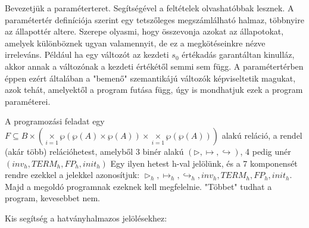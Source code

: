 \documentclass{article}
\begin{document}
Bevezetjük a paraméterteret. Segítségével a feltételek olvashatóbbak lesznek. A paramétertér definíciója szerint egy tetszőleges megszámlálható halmaz, többnyire az állapottér altere. Szerepe olyasmi, hogy összevonja azokat az állapotokat, amelyek különböznek ugyan valamennyit, de ez a megkötéseinkre nézve irreleváns. Például ha egy változót az kezdeti $s_0$ értékadás garantáltan kinulláz, akkor annak a változónak a kezdeti értékétől semmi sem függ. A paramétertérben éppen ezért általában a "bemenő" szemantikájú változók képviseltetik magukat, azok tehát, amelyektől a program futása függ, úgy is mondhatjuk ezek a program paraméterei.

A programozási feladat egy $F \subseteq B \times ( \underset{i=1}{\times} \wp(\wp(A) \times \wp(A)) \times  \underset{i=1}{\times} \wp(\wp(A)))$ alakú reláció, a rendel (akár több) relációhetest, amelyből 3 binér alakú $(\triangleright, \mapsto, \hookrightarrow)$, 4 pedig unér $(inv_h, TERM_h, FP_h, init_h)$ Egy ilyen hetest h-val jelölünk, és a 7 komponensét rendre ezekkel a jelekkel azonosítjuk: $\triangleright_h, \mapsto_h, \hookrightarrow_h, inv_h, TERM_h, FP_h, init_h$. Majd a megoldó programnak ezeknek kell megfelelnie. "Többet" tudhat a program, kevesebbet nem.

Kis segítség a hatványhalmazos jelölésekhez:
\end{document}
